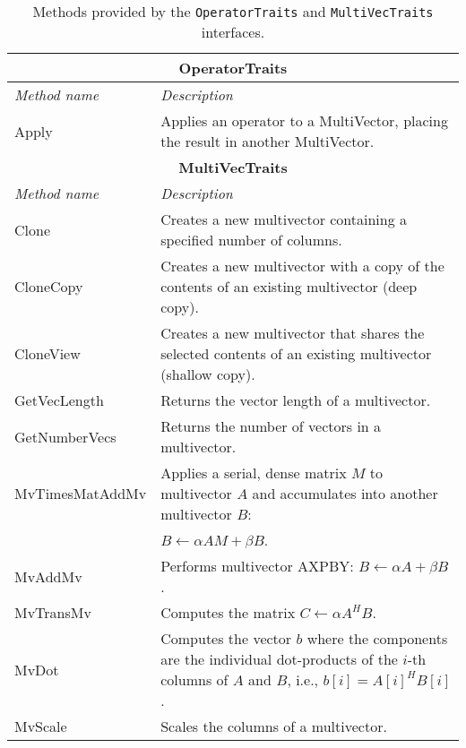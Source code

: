 \documentclass[acmtoms]{acmtrans2m}
\newcommand{\aspace}[1]{\texttt{#1}}
\begin{document}
\begin{table}
\begin{center}
  \caption{Methods provided by the \aspace{OperatorTraits} and \aspace{MultiVecTraits} interfaces.}
\label{tab:anasazi:mvt}
\begin{tabular}{| p{3cm} | p{8cm} |}
\hline
\multicolumn{2}{|c|}{\textbf{OperatorTraits}} \\\hline
\emph{Method name} & \emph{Description} \\\hline
Apply           & Applies an operator to a MultiVector, placing the
result in another MultiVector. \\\hline\hline
\multicolumn{2}{|c|}{\textbf{MultiVecTraits}} \\\hline
\emph{Method name} & \emph{Description} \\\hline
Clone           & Creates a new multivector containing a
specified number of columns.  \\\hline

CloneCopy & Creates a new multivector with a copy of the contents of
an existing multivector (deep copy). \\\hline

CloneView       & Creates a new multivector that shares the selected
contents of an existing multivector (shallow copy).  \\\hline

GetVecLength    & Returns the vector length of a multivector.
\\\hline

GetNumberVecs   & Returns the number of vectors in a multivector.
\\\hline

MvTimesMatAddMv & Applies a serial, dense matrix $M$ to
multivector $A$ and accumulates into another multivector $B$:\\
& $B \leftarrow \alpha A M + \beta B$.
\\\hline

MvAddMv         & Performs multivector AXPBY: $ B \leftarrow \alpha A + \beta B$.
\\\hline

MvTransMv & Computes the matrix $C \leftarrow \alpha A^H B$.
\\\hline

MvDot & Computes the vector $b$ where the components are the
individual dot-products of the $i$-th columns of $A$ and $B$, i.e.,
$b[i] = A[i]^H B[i]$.  \\\hline

MvScale         & Scales the columns of a multivector. \\\hline


\end{tabular}
\end{center}
\end{table}
\end{document}
